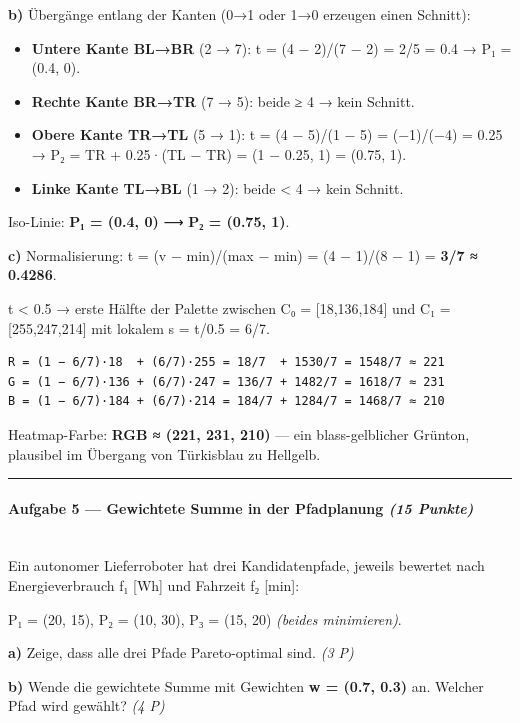 \documentclass[11pt, a4paper]{article}
\begin{document}
\textbf{b)} Übergänge entlang der Kanten (0→1 oder 1→0 erzeugen einen Schnitt):


\begin{itemize}
  \item \textbf{Untere Kante BL→BR} (2 → 7): t = (4 − 2)/(7 − 2) = 2/5 = 0.4 → P₁ = (0.4, 0).
  \item \textbf{Rechte Kante BR→TR} (7 → 5): beide ≥ 4 → kein Schnitt.
  \item \textbf{Obere Kante TR→TL} (5 → 1): t = (4 − 5)/(1 − 5) = (−1)/(−4) = 0.25 → P₂ = TR + 0.25·(TL − TR) = (1 − 0.25, 1) = (0.75, 1).
  \item \textbf{Linke Kante TL→BL} (1 → 2): beide < 4 → kein Schnitt.
\end{itemize}

Iso-Linie: \textbf{P₁ = (0.4, 0)} ⟶ \textbf{P₂ = (0.75, 1)}.


\textbf{c)} Normalisierung: t = (v − min)/(max − min) = (4 − 1)/(8 − 1) = \textbf{3/7 ≈ 0.4286}.

t < 0.5 → erste Hälfte der Palette zwischen C₀ = [18,136,184] und C₁ = [255,247,214] mit lokalem s = t/0.5 = 6/7.


\begin{lstlisting}
R = (1 − 6/7)·18  + (6/7)·255 = 18/7  + 1530/7 = 1548/7 ≈ 221
G = (1 − 6/7)·136 + (6/7)·247 = 136/7 + 1482/7 = 1618/7 ≈ 231
B = (1 − 6/7)·184 + (6/7)·214 = 184/7 + 1284/7 = 1468/7 ≈ 210
\end{lstlisting}


Heatmap-Farbe: \textbf{RGB ≈ (221, 231, 210)} — ein blass-gelblicher Grünton, plausibel im Übergang von Türkisblau zu Hellgelb.



\noindent\textcolor{rulegray}{\rule{\linewidth}{0.4pt}}


\paragraph{Aufgabe 5 — Gewichtete Summe in der Pfadplanung \textit{(15 Punkte)}}\mbox{}\\[2pt]

Ein autonomer Lieferroboter hat drei Kandidatenpfade, jeweils bewertet nach Energieverbrauch f₁ [Wh] und Fahrzeit f₂ [min]:


P₁ = (20, 15),  P₂ = (10, 30),  P₃ = (15, 20)  \textit{(beides minimieren)}.


\textbf{a)} Zeige, dass alle drei Pfade Pareto-optimal sind. \textit{(3 P)}


\textbf{b)} Wende die gewichtete Summe mit Gewichten \textbf{w = (0.7, 0.3)} an. Welcher Pfad wird gewählt? \textit{(4 P)}
\end{document}
